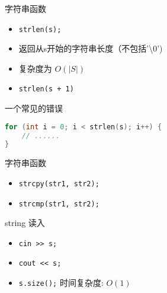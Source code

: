 \begin{frame}{字符串函数}
\begin{itemize}
    \item \texttt{strlen(s);}
    \item 返回从s开始的字符串长度（不包括'\textbackslash 0')
    \item 复杂度为 $O(|S|)$
    \item \texttt{strlen(s + 1)}
\end{itemize}
\end{frame}

\begin{frame}[fragile]{一个常见的错误}
\begin{lstlisting}[language=C++]
for (int i = 0; i < strlen(s); i++) {
    // ......
}
\end{lstlisting}
\end{frame}

\begin{frame}{字符串函数}
\begin{itemize}
    \item \texttt{strcpy(str1, str2);}
    \item \texttt{strcmp(str1, str2);}
\end{itemize}
\end{frame}

\begin{frame}{string 读入}
\begin{itemize}
    \item \texttt{cin >> s;}
    \item \texttt{cout << s;}
    \item \texttt{s.size();} 时间复杂度: $O(1)$
\end{itemize}
\end{frame}

% 
% 
% 
% 
% 
% 
